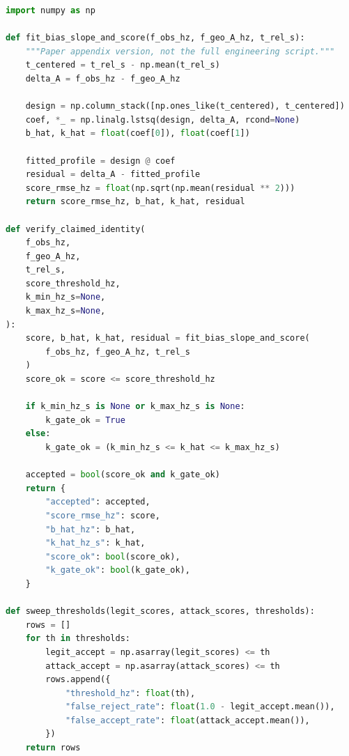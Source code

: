 \begin{lstlisting}[language=Python,caption={claimed-identity Doppler residual verifier 核心流程简化代码},label={lst:claimed_identity_verifier}]
import numpy as np

def fit_bias_slope_and_score(f_obs_hz, f_geo_A_hz, t_rel_s):
    """Paper appendix version, not the full engineering script."""
    t_centered = t_rel_s - np.mean(t_rel_s)
    delta_A = f_obs_hz - f_geo_A_hz

    design = np.column_stack([np.ones_like(t_centered), t_centered])
    coef, *_ = np.linalg.lstsq(design, delta_A, rcond=None)
    b_hat, k_hat = float(coef[0]), float(coef[1])

    fitted_profile = design @ coef
    residual = delta_A - fitted_profile
    score_rmse_hz = float(np.sqrt(np.mean(residual ** 2)))
    return score_rmse_hz, b_hat, k_hat, residual

def verify_claimed_identity(
    f_obs_hz,
    f_geo_A_hz,
    t_rel_s,
    score_threshold_hz,
    k_min_hz_s=None,
    k_max_hz_s=None,
):
    score, b_hat, k_hat, residual = fit_bias_slope_and_score(
        f_obs_hz, f_geo_A_hz, t_rel_s
    )
    score_ok = score <= score_threshold_hz

    if k_min_hz_s is None or k_max_hz_s is None:
        k_gate_ok = True
    else:
        k_gate_ok = (k_min_hz_s <= k_hat <= k_max_hz_s)

    accepted = bool(score_ok and k_gate_ok)
    return {
        "accepted": accepted,
        "score_rmse_hz": score,
        "b_hat_hz": b_hat,
        "k_hat_hz_s": k_hat,
        "score_ok": bool(score_ok),
        "k_gate_ok": bool(k_gate_ok),
    }

def sweep_thresholds(legit_scores, attack_scores, thresholds):
    rows = []
    for th in thresholds:
        legit_accept = np.asarray(legit_scores) <= th
        attack_accept = np.asarray(attack_scores) <= th
        rows.append({
            "threshold_hz": float(th),
            "false_reject_rate": float(1.0 - legit_accept.mean()),
            "false_accept_rate": float(attack_accept.mean()),
        })
    return rows
\end{lstlisting}
